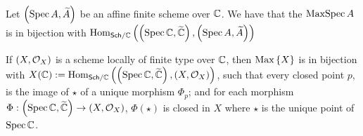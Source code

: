 \begin{corollary}\label{cor:affine-closed-point-bijection-scheme-morphism}
  Let $\spec A$ be an affine finite scheme over $\complex$. We have that the $\maxspecop A$ is in bijection with $\Hom_{\sch/\complex}\left(\spec\complex, \spec A\right)$
\end{corollary}

\begin{proposition}
  If $\schemeOf{X}$ is a scheme locally of finite type over $\complex$, then $\maxop X$ is in bijection with $X(\complex) := \Hom_{\sch/\complex}\left(\spec{\complex}, \schemeOf{X}\right)$,
  such that every closed point $p$, is the image of $\star$ of a unique morphism $\Phi_{p}$; and for each morphism $\Phi : \spec\complex\to\schemeOf{X}$, $\Phi(\star)$ is closed in $X$ where $\star$ is the unique point of $\specop\complex$.
\end{proposition}

